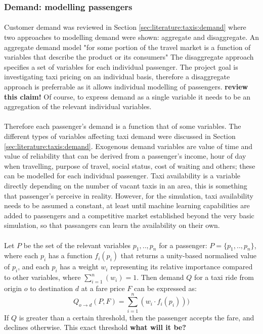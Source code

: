 \subsubsection{Demand: modelling passengers} 

\paragraph{} Customer demand was reviewed in Section
\ref{sec:literature:taxis:demand} where two approaches to modelling demand were
shown: aggregate and disaggregate. An aggregate demand model "for some portion
of the travel market is a function of variables that describe the product or
its consumers" \parencite{Small2007taxi+urban} The disaggregate approach
specifies a set of variables for each individual passenger. The project goal is
investigating taxi pricing on an individual basis, therefore a disaggregate
approach is preferrable as it allows individual modelling of passengers.
\textbf{review this claim!} Of course, to express demand as a single variable
it needs to be an aggregation of the relevant individual variables.

\paragraph{} Therefore each passenger's demand is a function that of some
variables. The different types of variables affecting taxi demand were
discussed in Section \ref{sec:literature:taxis:demand}. Exogenous demand
variables are value of time and value of reliability that can be derived from a
passenger's income, hour of day when travelling, purpose of travel, social
status, cost of waiting and others; these can be modelled for each individual
passenger. Taxi availability is a variable directly depending on the number of
vacant taxis in an area, this is something that passenger's perceive in
reality. However, for the simulation, taxi availability needs to be assumed a
constant, at least until machine learning capabilities are added to passengers
and a competitive market established beyond the very basic simulation, so that
passangers can learn the availability on their own.

\paragraph{} Let \(P\) be the set of the relevant variables \(p_1,..,p_n\) for
a  passenger: \(P = \{p_1,..,p_n\}\), \newline
where each \(p_i\) has a function \(f_i (p_i) \) that returns a unity-based  
normalised value of \(p_i\), \newline 
and each \(p_i\) has a weight \(w_i\) representing its relative importance  
compared to other variables, where \(\sum_{i=1}^n (w_i) = 1 \). \newline 
Then demand \(Q\) for a taxi ride from origin \(o\) to destination \(d\) at a  
fare price \(F\) can be expressed as: 
\[ Q _{o \rightarrow d} (P,F) = \sum_{i=1}^{n} (w_i \cdot f_i (p_i) )) \]
If \(Q\) is greater than a certain threshold, then the passenger accepts the 
fare, and declines otherwise. This exact threshold \textbf{what will it be?}

